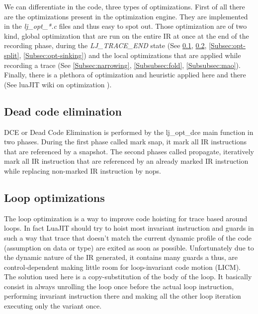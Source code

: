 
We can differentiate in the code, three types of optimizations.
First of all there are the optimizations present in the optimization engine.
They are implemented in the \emph{lj\_opt\_*.c} files and thus easy to spot out.
Those optimization are of two kind, global optimization that are run on the
entire IR at once at the end of the recording phase, during the
\emph{LJ\_TRACE\_END} state (See \ref{Subsec:opt-dce}, \ref{Subsec:opt-loop},
\ref{Subsec:opt-split}, \ref{Subsec:opt-sinking}) and the local optimizations
that are applied while recording a trace (See \ref{Subsec:narrowing},
\ref{Subsubsec:fold}, \ref{Subsubsec:mao}). Finally, there is a plethora of
optimization and heuristic applied here and there (See luaJIT wiki on
optimization \cite{luajit-opt}).


\subsection{Dead code elimination}
\label{Subsec:opt-dce}

DCE or Dead Code Elimination is performed by the lj\_opt\_dce main function
in two phases. During the first phase called mark snap, it mark all IR
instructions that are referenced by a snapshot. The second phases called
propagate, iteratively mark all IR instruction that are referenced by an already
marked IR instruction while replacing non-marked IR instruction by nops.


\subsection{Loop optimizations}
\label{Subsec:opt-loop}

The loop optimization is a way to improve code hoisting for trace based around
loops. In fact LuaJIT should try to hoist most invariant instruction and guards
in such a way that trace that doesn't match the current dynamic profile of
the code (assumption on data or type) are exited as soon as possible.
Unfortunately due to the dynamic nature of the IR generated, it contains many
guards a thus, are control-dependent making little room for loop-invariant
code motion (LICM). The solution used here is a copy-substitution of the body
of the loop. It basically consist in always unrolling the loop once before the
actual loop instruction, performing invariant instruction there and making
all the other loop iteration executing only the variant once.

